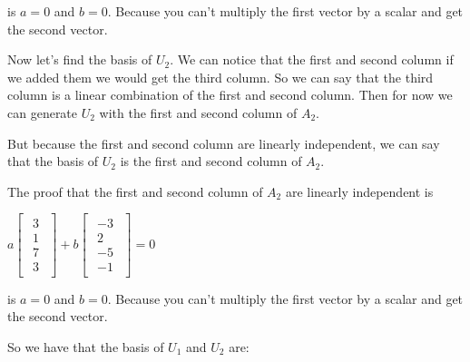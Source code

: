 \singlespacing

is $a=0$ and $b=0$. Because you can't multiply the first vector by a scalar and
get the second vector.

\singlespacing

Now let's find the basis of $U_2$. We can notice that the first and second column
if we added them we would get the third column. So we can say that the third
column is a linear combination of the first and second column. Then for now we
can generate $U_2$ with the first and second column of $A_2$.

\singlespacing

But because the first and second column are linearly independent, we can say that
the basis of $U_2$ is the first and second column of $A_2$.

\singlespacing

The proof that the first and second column of $A_2$ are linearly independent is

\singlespacing

\begin{math}
    a \begin{bmatrix}
        \begin{array}{c}
            3 \\
            1 \\
            7 \\
            3
        \end{array}
    \end{bmatrix}
    +b \begin{bmatrix}
        \begin{array}{c}
            -3 \\
            2  \\
            -5 \\
            -1
        \end{array}
    \end{bmatrix}
    = 0
\end{math}

\singlespacing

is $a=0$ and $b=0$. Because you can't multiply the first vector by a scalar and
get the second vector.

\singlespacing

So we have that the basis of $U_1$ and $U_2$ are:

\singlespacing

